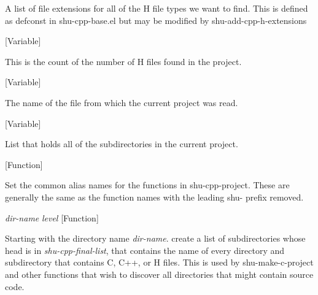 \begin{doc-string}
A list of file extensions for all of the H file types we want to find.  This is defined
as defconst in shu-cpp-base.el but may be modified by shu-add-cpp-h-extensions
\end{doc-string}

\vspace{1em}
\noindent
{}
\usebox{\funcname}
 \hfill [Variable]

\begin{doc-string}
This is the count of the number of H files found in the project.
\end{doc-string}

\vspace{1em}
\noindent
{}
\usebox{\funcname}
 \hfill [Variable]

\begin{doc-string}
The name of the file from which the current project was read.
\end{doc-string}

\vspace{1em}
\noindent
{}
\usebox{\funcname}
 \hfill [Variable]

\begin{doc-string}
List that holds all of the subdirectories in the current project.
\end{doc-string}

\vspace{1em}
\noindent
{}
\usebox{\funcname}
 \hfill [Function]

\begin{doc-string}
Set the common alias names for the functions in shu-cpp-project.
These are generally the same as the function names with the leading
shu- prefix removed.
\end{doc-string}

\vspace{1em}
\noindent
{}
\usebox{\funcname}\emph{dir-name} \emph{level}
 \hfill [Function]

\begin{doc-string}
Starting with the directory name \emph{dir-name}. create a list of subdirectories
whose head is in \emph{shu-cpp-final-list}, that contains the name of every directory and
subdirectory that contains C, C++, or H files.  This is used by shu-make-c-project
and other functions that wish to discover all directories that might contain
source code.
\end{doc-string}

